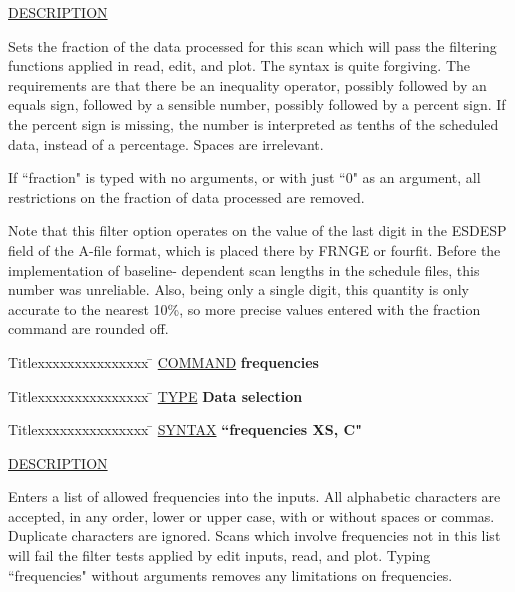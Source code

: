 \underline{DESCRIPTION}
\begin{list}{}{\setlength{\leftmargin}{0.5in}
     \setlength{\rightmargin}{0in}}
\item
Sets the fraction of the data processed for this scan which
will pass the filtering functions applied in read, edit, and
plot.  The syntax is quite forgiving.  The requirements are
that there be an inequality operator, possibly followed by
an equals sign, followed by a sensible number, possibly followed
by a percent sign.  If the percent sign is missing, the number
is interpreted as tenths of the scheduled data, instead of a 
percentage.  Spaces are irrelevant.
\item
If ``fraction" is typed with no arguments, or with
just ``0" as an argument, all restrictions on the fraction of
data processed are removed.
\item
Note that this filter option operates on the value of the last
digit in the ESDESP field of the A-file format, which is placed
there by FRNGE or fourfit.  Before the implementation of baseline-
dependent scan lengths in the schedule files, this number was 
unreliable.  Also, being only a single digit, this quantity is 
only accurate to the nearest 10\%, so more precise values entered 
with the fraction command are rounded off.
\item
\end{list}
\vspace{.2in}

\begin{tabbing}
Titlexxxxxxxxxxxxxxx \= \kill
\underline{COMMAND} \> {\bf 	frequencies} \\
\end{tabbing}

\begin{tabbing}
Titlexxxxxxxxxxxxxxx \= \kill
\underline{TYPE} \> {\bf 		Data selection} \\
\end{tabbing}

\begin{tabbing}
Titlexxxxxxxxxxxxxxx \= \kill
\underline{SYNTAX} \> {\bf 		``frequencies XS, C"} \\
\end{tabbing}

\underline{DESCRIPTION}
\begin{list}{}{\setlength{\leftmargin}{0.5in}
     \setlength{\rightmargin}{0in}}
\item
Enters a list of allowed frequencies into the inputs.  All alphabetic
characters are accepted, in any order, lower or upper case, with or
without spaces or commas.  Duplicate characters are ignored.  Scans
which involve frequencies not in this list will fail the filter tests
applied by edit inputs, read, and plot.  Typing ``frequencies" without
arguments removes any limitations on frequencies.
\end{list}
\vspace{.2in}

